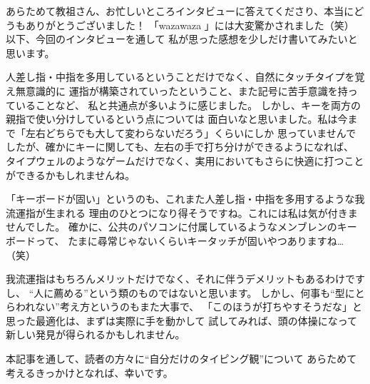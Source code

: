 


\newpage

あらためて教祖さん、お忙しいところインタビューに答えてくださり、本当にどうもありがとうございました！
「wazawaza 」には大変驚かされました（笑）　以下、今回のインタビューを通して
私が思った感想を少しだけ書いてみたいと思います。


人差し指・中指を多用しているということだけでなく、自然にタッチタイプを覚え無意識的に
運指が構築されていったということ、また記号に苦手意識を持っていることなど、
私と共通点が多いように感じました。
しかし、キーを両方の親指で使い分けしているという点については
面白いなと思いました。私は今まで「左右どちらでも大して変わらないだろう」くらいにしか
思っていませんでしたが、確かにキーに関しても、左右の手で打ち分けができるようになれば、
タイプウェルのようなゲームだけでなく、実用においてもさらに快適に打つことができるかもしれませんね。


「キーボードが固い」というのも、これまた人差し指・中指を多用するような我流運指が生まれる
理由のひとつになり得そうですね。これには私は気が付きませんでした。
確かに、公共のパソコンに付属しているようなメンブレンのキーボードって、
たまに尋常じゃないくらいキータッチが固いやつありますね…（笑）


我流運指はもちろんメリットだけでなく、それに伴うデメリットもあるわけですし、
“人に薦める”という類のものではないと思います。
しかし、何事も“型にとらわれない”考え方というのもまた大事で、
「このほうが打ちやすそうだな」と思った最適化は、まずは実際に手を動かして
試してみれば、頭の体操になって新しい発見が得られるかもしれません。


本記事を通して、読者の方々に“自分だけのタイピング観”について
あらためて考えるきっかけとなれば、幸いです。



